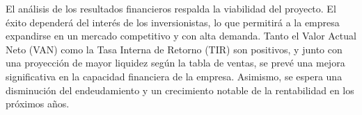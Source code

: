 El análisis de los resultados financieros respalda la viabilidad del proyecto. El éxito dependerá del interés de los inversionistas, lo que permitirá a la empresa expandirse en un mercado competitivo y con alta demanda. Tanto el Valor Actual Neto (VAN) como la Tasa Interna de Retorno (TIR) son positivos, y junto con una proyección de mayor liquidez según la tabla de ventas, se prevé una mejora significativa en la capacidad financiera de la empresa. Asimismo, se espera una disminución del endeudamiento y un crecimiento notable de la rentabilidad en los próximos años.
